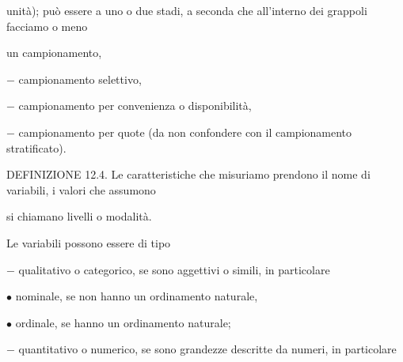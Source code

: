 \documentclass[a4paper,portrait,12pt]{article}
\begin{document}
\begin{flushleft}
unit\`{a}); pu\`{o} essere a uno o due stadi, a seconda che all'interno dei grappoli facciamo o meno
\end{flushleft}


\begin{flushleft}
un campionamento,
\end{flushleft}


\begin{flushleft}
$-$ campionamento selettivo,
\end{flushleft}


\begin{flushleft}
$-$ campionamento per convenienza o disponibilit\`{a},
\end{flushleft}


\begin{flushleft}
$-$ campionamento per quote (da non confondere con il campionamento stratificato).
\end{flushleft}


\begin{flushleft}
DEFINIZIONE 12.4. Le caratteristiche che misuriamo prendono il nome di variabili, i valori che assumono
\end{flushleft}


\begin{flushleft}
si chiamano livelli o modalit\`{a}.
\end{flushleft}


\begin{flushleft}
Le variabili possono essere di tipo
\end{flushleft}


\begin{flushleft}
$-$ qualitativo o categorico, se sono aggettivi o simili, in particolare
\end{flushleft}


\begin{flushleft}
$\bullet$ nominale, se non hanno un ordinamento naturale,
\end{flushleft}


\begin{flushleft}
$\bullet$ ordinale, se hanno un ordinamento naturale;
\end{flushleft}


\begin{flushleft}
$-$ quantitativo o numerico, se sono grandezze descritte da numeri, in particolare
\end{flushleft}
\end{document}
